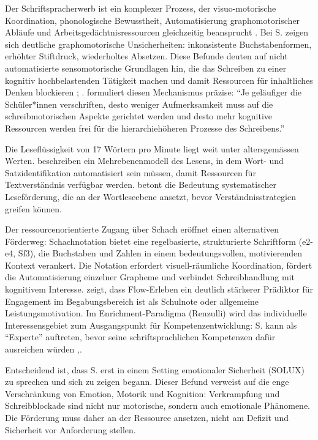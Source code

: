 \documentclass[ngerman, a4paper]{article}
\begin{document}
Der Schriftspracherwerb ist ein komplexer Prozess, der visuo-motorische Koordination,
phonologische Bewusstheit, Automatisierung graphomotorischer Abläufe und
Arbeitsgedächtnisressourcen gleichzeitig beansprucht
\parencite[S.\,125--138]{nottbusch2017graphomotorik}. Bei S. zeigen sich deutliche
graphomotorische Unsicherheiten: inkonsistente Buchstabenformen, erhöhter Stiftdruck,
wiederholtes Absetzen. Diese Befunde deuten auf nicht automatisierte sensomotorische
Grundlagen hin, die das Schreiben zu einer kognitiv hochbelastenden Tätigkeit machen
und damit Ressourcen für inhaltliches Denken blockieren
\parencite[Kap.\,1--4]{rosebrock2010grundlagen};
\parencite[Kap.\,1--4]{gold2018lesenkannmanlernen}.
\textcite[S.\,3]{hurschler2020handschriftbeurteilung} formuliert diesen
Mechanismus präzise: \enquote{Je geläufiger die Schüler*innen verschriften, desto
weniger Aufmerksamkeit muss auf die schreibmotorischen Aspekte gerichtet werden
und desto mehr kognitive Ressourcen werden frei für die hierarchiehöheren
Prozesse des Schreibens.}
 
Die Leseflüssigkeit von 17 Wörtern pro Minute liegt weit unter altersgemässen Werten.
\textcite[Kap.\,1--4]{rosebrock2010grundlagen} beschreiben ein Mehrebenenmodell des Lesens, in dem Wort- und
Satzidentifikation automatisiert sein müssen, damit Ressourcen für Textverständnis
verfügbar werden. \textcite[Kap.\,1--4]{gold2018lesenkannmanlernen} betont die Bedeutung
systematischer Leseförderung, die an der Wortleseebene ansetzt, bevor
Verständnisstrategien greifen können.
 
Der ressourcenorientierte Zugang über Schach eröffnet einen alternativen Förderweg:
Schachnotation bietet eine regelbasierte, strukturierte Schriftform (e2-e4, Sf3), die
Buchstaben und Zahlen in einem bedeutungsvollen, motivierenden Kontext verankert.
Die Notation erfordert visuell-räumliche Koordination, fördert die Automatisierung
einzelner Grapheme und verbindet Schreibhandlung mit kognitivem Interesse.
\textcite[S.\,84--89]{lehwald2017motivation} zeigt, dass Flow-Erleben ein
deutlich stärkerer Prädiktor für Engagement im Begabungsbereich ist als
Schulnote oder allgemeine Leistungsmotivation. Im Enrichment-Paradigma
(Renzulli) wird das individuelle Interessensgebiet zum Ausgangspunkt für
Kompetenzentwicklung: S. kann als \enquote{Experte} auftreten, bevor seine schriftsprachlichen
Kompetenzen dafür ausreichen würden
\parencite[S.\,444--454]{renzullireis2021rls},\parencite[S.\,254--273]{fischer2020begabungsfoerderung}.
 
Entscheidend ist, dass S. erst in einem Setting emotionaler Sicherheit (SOLUX) zu
sprechen und sich zu zeigen begann. Dieser Befund verweist auf die enge Verschränkung
von Emotion, Motorik und Kognition: Verkrampfung und Schreibblockade sind nicht nur
motorische, sondern auch emotionale Phänomene. Die Förderung muss daher an der
Ressource ansetzen, nicht am Defizit und Sicherheit vor Anforderung stellen.
\end{document}
